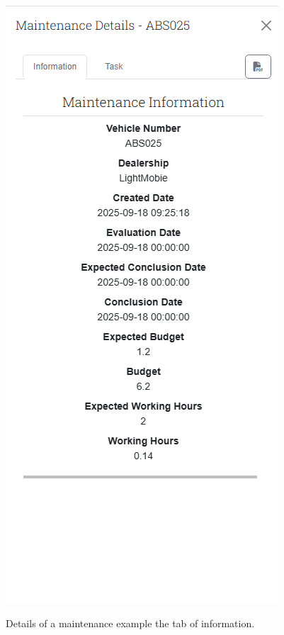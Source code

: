 \begin{figure}[htbp]
  \caption{Details of a maintenance example the tab of information.}
  \centering
  \includegraphics[width=\textwidth]{figs/Implementation/client/MaintenanceDetailsInfo}
  \label{fig:MaintenanceDetailsInfo}
\end{figure}


